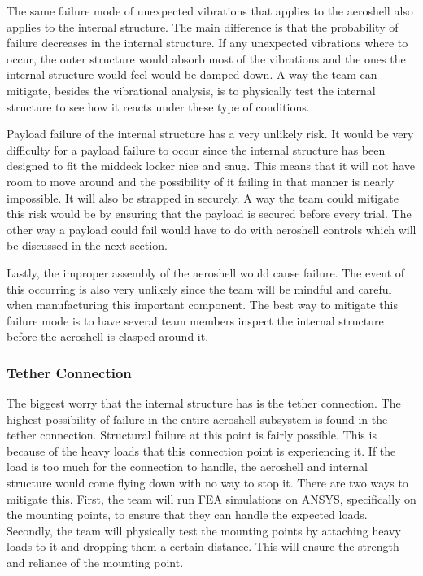 The same failure mode of unexpected vibrations that applies to the aeroshell also applies to the internal structure. The main difference is that the probability of failure decreases in the internal structure. If any unexpected vibrations where to occur, the outer structure would absorb most of the vibrations and the ones the internal structure would feel would be damped down. A way the team can mitigate, besides the vibrational analysis, is to physically test the internal structure to see how it reacts under these type of conditions.

Payload failure of the internal structure has a very unlikely risk. It would be very difficulty for a payload failure to occur since the internal structure has been designed to fit the middeck locker nice and snug. This means that it will not have room to move around and the possibility of it failing in that manner is nearly impossible. It will also be strapped in securely. A way the team could mitigate this risk would be by ensuring that the payload is secured before every trial. The other way a payload could fail would have to do with aeroshell controls which will be discussed in the next section. 

Lastly, the improper assembly of the aeroshell would cause failure. The event of this occurring is also very unlikely since the team will be mindful and careful when manufacturing this important component. The best way to mitigate this failure mode is to have several team members inspect the internal structure before the aeroshell is clasped around it. 

\subsubsection*{Tether Connection}
\indent\indent The biggest worry that the internal structure has is the tether connection. The highest possibility of failure in the entire aeroshell subsystem is found in the tether connection. Structural failure at this point is fairly possible. This is because of the heavy loads that this connection point is experiencing it. If the load is too much for the connection to handle, the aeroshell and internal structure would come flying down with no way to stop it. There are two ways to mitigate this. First, the team will run FEA simulations on ANSYS, specifically on the mounting points, to ensure that they can handle the expected loads. Secondly, the team will physically test the mounting points by attaching heavy loads to it and dropping them a certain distance. This will ensure the strength and reliance of the mounting point. 

